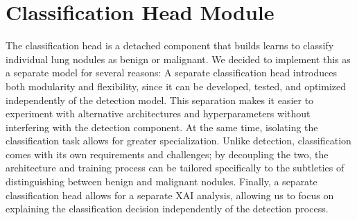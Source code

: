 \section{Classification Head Module}

The classification head is a detached component that builds learns to classify individual lung nodules as benign or malignant.
We decided to implement this as a separate model for several reasons:
A separate classification head introduces both modularity and flexibility, since it can be developed, tested, and optimized independently of the detection model. This separation makes it easier to experiment with alternative architectures and hyperparameters without interfering with the detection component. At the same time, isolating the classification task allows for greater specialization. Unlike detection, classification comes with its own requirements and challenges; by decoupling the two, the architecture and training process can be tailored specifically to the subtleties of distinguishing between benign and malignant nodules.
Finally, a separate classification head allows for a separate XAI analysis, allowing us to focus on explaining the classification decision independently of the detection process.


